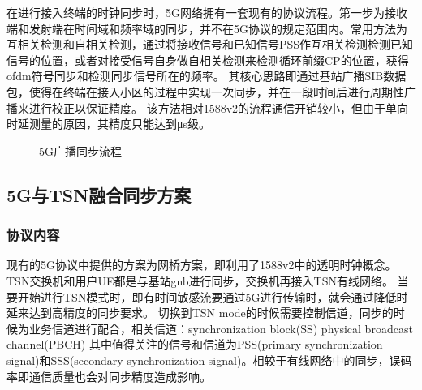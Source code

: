 \documentclass[UTF8,a4paper,12pt]{ctexart}
\numberwithin{equation}{section}
\begin{document}
在进行接入终端的时钟同步时，5G网络拥有一套现有的协议流程。第一步为接收端和发射端在时间域和频率域的同步，并不在5G协议的规定范围内。常用方法为互相关检测和自相关检测，通过将接收信号和已知信号PSS作互相关检测检测已知信号的位置，或者对接受信号自身做自相关检测来检测循环前缀CP的位置，获得ofdm符号同步和检测同步信号所在的频率。
其核心思路即通过基站广播SIB数据包，使得在终端在接入小区的过程中实现一次同步，并在一段时间后进行周期性广播来进行校正以保证精度。
该方法相对1588v2的流程通信开销较小，但由于单向时延测量的原因，其精度只能达到μs级。

\begin{figure}[htb]
	\caption{\label{1} 5G广播同步流程}
\end{figure}
\subsection{5G与TSN融合同步方案}
\subsubsection{协议内容}
现有的5G协议中提供的方案为网桥方案，即利用了1588v2中的透明时钟概念。TSN交换机和用户UE都是与基站gnb进行同步，交换机再接入TSN有线网络。
当要开始进行TSN模式时，即有时间敏感流要通过5G进行传输时，就会通过降低时延来达到高精度的同步要求。
切换到TSN mode的时候需要控制信道，同步的时候为业务信道进行配合，相关信道：synchronization block(SS)   physical broadcast channel(PBCH)
其中值得关注的信号和信道为PSS(primary synchronization signal)和SSS(secondary synchronization signal)。相较于有线网络中的同步，误码率即通信质量也会对同步精度造成影响。
\end{document}
